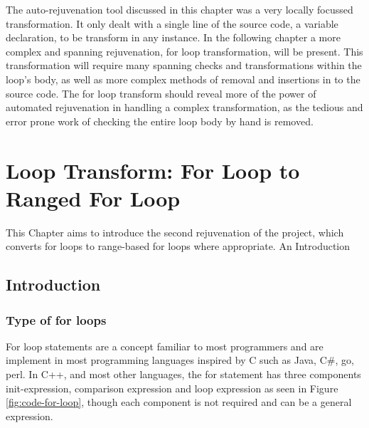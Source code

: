 \documentclass[bsc,frontabs,singlespacing,parskip,deptreport]{infthesis}
\begin{document}
The auto-rejuvenation tool discussed in this chapter was a very locally focussed transformation. It only dealt with a single line of the source code, a variable declaration, to be transform in any instance. In the following chapter a more complex and spanning rejuvenation, for loop transformation, will be present. This transformation will require many spanning checks and transformations within the loop's body, as well as more complex methods of removal and insertions in to the source code. The for loop transform should reveal more of the power of automated rejuvenation in handling a complex transformation, as  the tedious and error prone work of checking the entire loop body by hand is removed.



\chapter{Loop Transform: For Loop to Ranged For Loop}\label{chp:loop-transform}

This Chapter aims to introduce the second rejuvenation of the project, which converts for loops to range-based for loops where appropriate. An Introduction 

\section{Introduction}
\subsection{Type of for loops}
For loop statements are a concept familiar to most programmers and are implement in most programming languages inspired by C such as Java, C\#, go, perl. In C++, and most other languages, the for statement has three components init-expression, comparison expression and loop expression as seen in Figure \ref{fig:code-for-loop}, though each component is not required and can be a general expression. 
\end{document}
